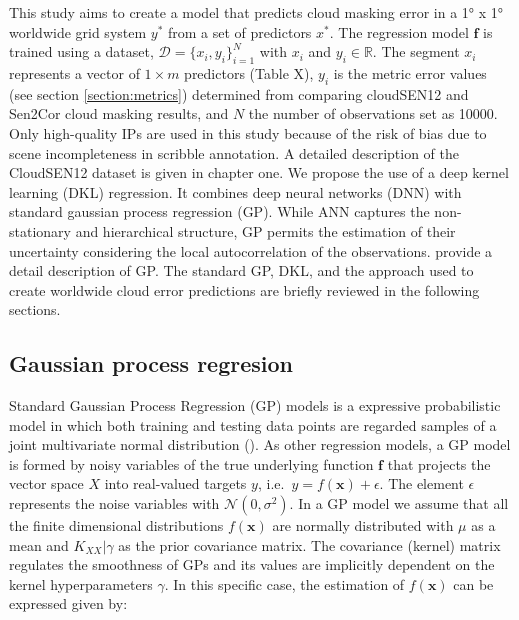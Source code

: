 \documentclass[a4paper, nobind]{templates/cdethesis}
\begin{document}
This study aims to create a model that predicts cloud masking error in
a 1° x 1° worldwide grid system \(y^*\) from a set of predictors \(x^*\). The regression model \(\mathbf{f}\) is trained using a dataset, \(\mathcal{D} = \{x_i, y_i\}^{N}_{i=1}\) with \(x_i\) and \(y_i \in \mathbb{R}\). The segment \(x_i\) represents a vector of \(1 \times m\) predictors (Table X), \(y_i\) is the metric error values (see section \ref{section:metrics}) determined from comparing cloudSEN12 and Sen2Cor cloud masking results, and \(N\) the number of observations set as 10000. Only high-quality IPs are used in this study because of the risk of bias due to scene incompleteness in scribble annotation. A detailed description of the CloudSEN12 dataset is given in chapter one. We propose the use of a deep kernel learning (DKL) regression. It combines deep neural networks (DNN) with standard gaussian process regression (GP). While ANN captures the non-stationary and hierarchical structure, GP permits the estimation of their uncertainty considering the local autocorrelation of the observations. \cite{rasmussen2003gaussian} provide a detail description of GP. The standard GP, DKL, and the approach used to create worldwide cloud error predictions are briefly reviewed in the following sections.

\hypertarget{gaussian-process-regresion}{%
\subsection{Gaussian process regresion}\label{gaussian-process-regresion}}

Standard Gaussian Process Regression (GP) models is a expressive probabilistic model in which both training and testing data points are regarded samples of a joint multivariate normal distribution (\cite{williams2006gaussian}). As other regression models, a GP model is formed by noisy variables of the true underlying function \(\mathbf{f}\) that projects the vector space \(X\) into real-valued targets \(y\), i.e.~\(y = f(\mathbf{x}) + \epsilon\). The element \(\epsilon\) represents the noise variables with \(\mathcal{N}(0, \sigma^{2})\). In a GP model we assume that all the finite dimensional distributions \(f(\mathbf{x})\) are normally distributed with \(\mu\) as a mean and \(K_{XX}|\gamma\) as the prior covariance matrix. The covariance (kernel) matrix regulates the smoothness of GPs and its values are implicitly dependent on the kernel hyperparameters \(\gamma\). In this specific case, the estimation of \(f(\mathbf{x})\) can be expressed given by:
\end{document}

